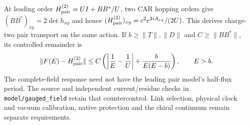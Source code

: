 At leading order $H_{\rm pair}^{(2)}=UI+BB^*/U$, two CAR hopping orders
give $(BB^*)_{xy}=2\det h_{xy}$ and hence
$(H_{\rm pair}^{(2)})_{xy}=c^2e^{2iA_{xy}}/(2U)$.
This derives charge-two pair transport on the same action. If
$b\ge\|T\|,\|D\|$ and $C\ge\|BB^*\|$, its controlled remainder is
\[
 \|F(E)-H_{\rm pair}^{(2)}\|
 \le C\left(\left|\frac1E-\frac1U\right|
              +\frac{b}{E(E-b)}\right),\qquad E>b.
\]
The complete-field response need not have the leading pair model's half-flux
period. The source and independent current/residue checks in
\texttt{model/gauged\_field} retain that countercontrol. Link selection,
physical clock and vacuum calibration, native protection and the chiral
continuum remain separate requirements.

